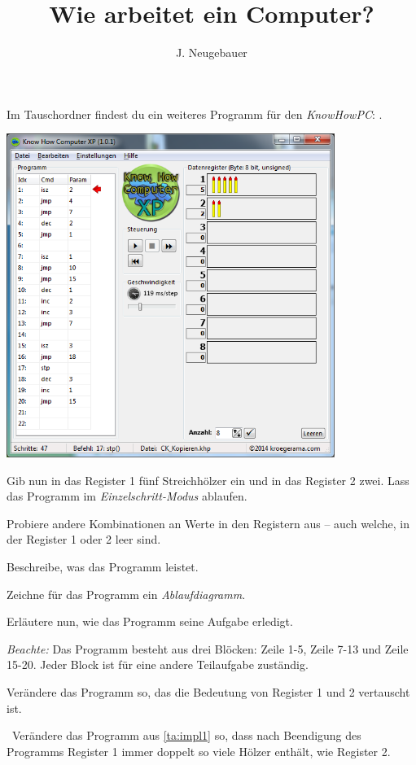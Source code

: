 \documentclass[10pt, a4paper]{scrartcl}
\author{J. Neugebauer}
\title{Wie arbeitet ein Computer?}
\date{\Heute}
\begin{document}
\ReiheTitel

\begin{aufgabe}[symbol=\symLaptop]
	Im Tauschordner findest du ein weiteres Programm für den \emph{KnowHowPC}: .
	
	\begin{center}
		\includegraphics[width=0.8\textwidth]{9Diff-AB.3-Abb-1}
	\end{center}
	
	\begin{teilaufgaben}
		\teilaufgabe Gib nun in das Register 1 fünf Streichhölzer ein und in das Register 2 zwei. Lass das Programm im \emph{Einzelschritt-Modus} ablaufen.
		
		\teilaufgabe Probiere andere Kombinationen an Werte in den Registern aus – auch welche, in der Register 1 oder 2 leer sind.
		
		\teilaufgabe Beschreibe, was das Programm leistet.
		
		\teilaufgabe Zeichne für das Programm ein \emph{Ablaufdiagramm}.
		
		\teilaufgabe Erläutere nun, wie das Programm seine Aufgabe erledigt.
		
		\emph{Beachte:} Das Programm besteht aus drei Blöcken: Zeile 1-5, Zeile 7-13 und Zeile 15-20. Jeder Block ist für eine andere Teilaufgabe zuständig.
		
		\teilaufgabe\label{ta:impl1} Verändere das Programm so, das die Bedeutung von Register 1 und 2 vertauscht ist.
		
		\teilaufgabe\symStern\ Verändere das Programm aus \ref{ta:impl1} so, dass nach Beendigung des Programms Register 1 immer doppelt so viele Hölzer enthält, wie Register 2.
	\end{teilaufgaben}
\end{aufgabe}
\end{document}
